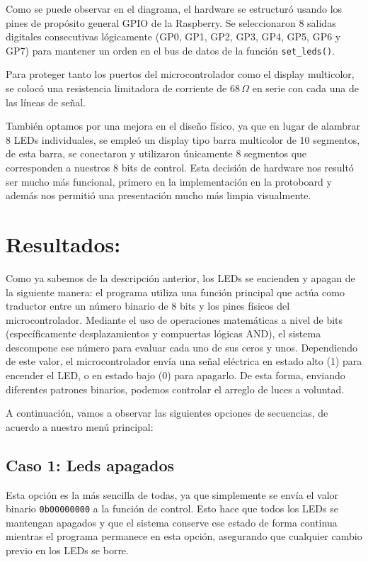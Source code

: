 \documentclass[letterpaper,12pt]{article}
\begin{document}
    Como se puede observar en el diagrama, el hardware se estructuró usando los pines de propósito general GPIO de la Raspberry. Se seleccionaron 8 salidas digitales consecutivas lógicamente (GP0, GP1, GP2, GP3, GP4, GP5, GP6 y GP7) para mantener un orden en el bus de datos de la función \texttt{set\_leds()}.
    
    Para proteger tanto los puertos del microcontrolador como el display multicolor, se colocó una resistencia limitadora de corriente de $68\,\Omega$ en serie con cada una de las líneas de señal. 
    
    También optamos por una mejora en el diseño físico, ya que en lugar de alambrar 8 LEDs individuales, se empleó un display tipo barra multicolor de 10 segmentos, de esta barra, se conectaron y utilizaron únicamente 8 segmentos que corresponden a nuestros 8 bits de control. Esta decisión de hardware nos resultó ser mucho más funcional, primero en la implementación en la protoboard y además nos permitió una presentación mucho más limpia visualmente.

    

    \newpage
    \section{Resultados:}


    Como ya sabemos de la descripción anterior, los LEDs se encienden y apagan de la siguiente manera: el programa utiliza una función principal que actúa como traductor entre un número binario de 8 bits y los pines físicos del microcontrolador. Mediante el uso de operaciones matemáticas a nivel de bits (específicamente desplazamientos y compuertas lógicas AND), el sistema descompone ese número para evaluar cada uno de sus ceros y unos. Dependiendo de este valor, el microcontrolador envía una señal eléctrica en estado alto (1) para encender el LED, o en estado bajo (0) para apagarlo. De esta forma, enviando diferentes patrones binarios, podemos controlar el arreglo de luces a voluntad.

    A continuación, vamos a observar las siguientes opciones de secuencias, de acuerdo a nuestro menú principal:
    \subsection{Caso 1: Leds apagados}

    Esta opción es la más sencilla de todas, ya que simplemente se envía el valor binario \texttt{0b00000000} a la función de control. Esto hace que todos los LEDs se mantengan apagados y que el sistema conserve ese estado de forma continua mientras el programa permanece en esta opción, asegurando que cualquier cambio previo en los LEDs se borre.
\end{document}
